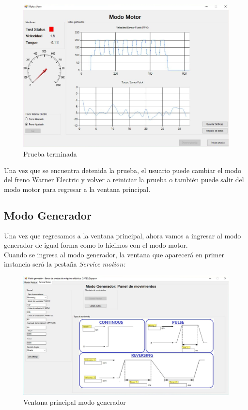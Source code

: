 \documentclass[12pt,titlepage]{article}
\begin{document}
\begin{figure}[htbp]
\hspace*{1.8cm} 
\includegraphics[scale=0.58]{end_test2}
\caption{Prueba terminada}
\end{figure}

Una vez que se encuentra detenida la prueba, el usuario puede cambiar el modo del freno Warner Electric y volver a reiniciar la prueba o también puede salir del modo motor para regresar a la ventana principal. \\
\newpage
\subsection{Modo Generador}

Una vez que regresamos  a la ventana principal, ahora vamos a ingresar al modo generador de igual forma como lo hicimos con el modo motor. \\ 


Cuando se ingresa al modo generador, la ventana que aparecerá en primer instancia será la pestaña \textit{Service motion: }\\ 

\begin{figure}[htbp]
\hspace*{0.8cm} 
\includegraphics[scale=0.51]{First_screen_gen_mode}
\caption{Ventana principal modo generador}
\end{figure}
\end{document}

